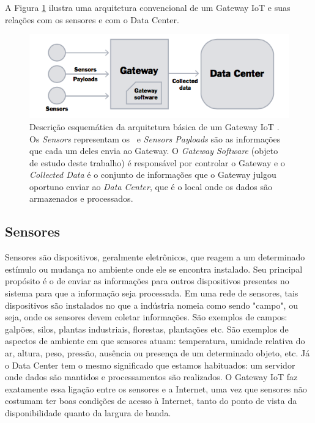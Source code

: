 A Figura \ref{fig:arquiteturaIotGateway} ilustra uma arquitetura convencional de um Gateway IoT e suas relações com os sensores e com o Data Center.
\begin{figure}[h!]
	\begin{center}
		\includegraphics[width=1\textwidth]{./img/rumFxS7.png}
		\caption{Descrição esquemática da arquitetura básica de um Gateway IoT \cite{DZone}. Os \textit{Sensors} representam os~ e \textit{Sensors Payloads} são as informações que cada um deles envia ao Gateway. O \textit{Gateway Software} (objeto de estudo deste trabalho) é responsável por controlar o Gateway e o \textit{Collected Data} é o conjunto de  informações que o Gateway julgou oportuno enviar ao \textit{Data Center}, que é o local onde os dados são armazenados e processados. }
		\label{fig:arquiteturaIotGateway}
	\end{center}
\end{figure}

\subsection{Sensores}
\label{sensores}
Sensores são dispositivos, geralmente eletrônicos, que reagem a um determinado estímulo ou mudança no ambiente onde ele se encontra instalado. Seu principal propósito é o de enviar as informações para outros dispositivos presentes no sistema para que a informação seja processada. Em uma rede de sensores, tais dispositivos são instalados no que a indústria nomeia como sendo "campo", ou seja, onde os sensores devem coletar informações. São exemplos de campos: galpões, silos, plantas industriais, florestas, plantações etc. São exemplos de aspectos de ambiente em que sensores atuam: temperatura, umidade relativa do ar, altura, peso, pressão, ausência ou presença de um determinado objeto, etc. Já o Data Center tem o mesmo significado que estamos habituados: um servidor onde dados são mantidos e processamentos são realizados. O Gateway IoT faz exatamente essa ligação entre os sensores e a Internet, uma vez que sensores não costumam ter boas condições de acesso à Internet, tanto do ponto de vista da disponibilidade quanto da largura de banda.

